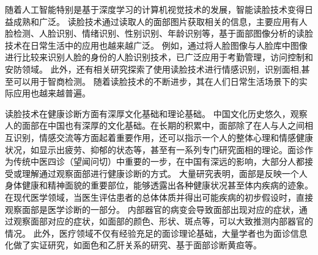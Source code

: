 % 
随着人工智能特别是基于深度学习的计算机视觉技术的发展，智能读脸技术变得日益成熟和广泛。
读脸技术通过读取人的面部图片获取相关的信息，主要应用有人脸检测、人脸识别、情绪识别、性别识别、年龄识别等，基于面部图像分析的读脸技术在日常生活中的应用也越来越广泛。
例如，通过将人脸图像与人脸库中图像进行比较来识别人脸的身份的人脸识别技术\cite{Zhang2016Joint, Schroff2015FaceNet}，已广泛应用于考勤管理\cite{surekha2017attendance}，访问控制\cite{atick2000continuous}和安防领域\cite{liu2005ibotguard}。
此外，还有相关研究探索了使用读脸技术进行情感识别\cite{corneanu2016survey}，识别面相\cite{Li2007Online, Tempark2012Chinese},甚至可以用于智商检测\cite{Kleisner2014Perceived}。
随着读脸技术的不断进步，其在人们日常生活场景下的实际应用也越来越普遍。

读脸技术在健康诊断方面有深厚文化基础和理论基础。
中国文化历史悠久，观察人的面部在中国也有深厚的文化基础。在长期的积累中，面部除了在人与人之间相互识别，情感交流等方面起着重要作用，还可以指示一个人的整体心理和情感健康状况，如显示出疲劳、抑郁的状态等，甚至有一系列专门研究面相的理论。面诊作为传统中医四诊（望闻问切）中重要的一步，在中国有深远的影响，大部分人都接受或理解通过观察面部进行健康诊断的方式。
大量研究表明，面部是反映一个人身体健康和精神面貌的重要部位，能够透露出各种健康状况甚至体内疾病的迹象。
在现代医学领域，当医生评估患者的总体体质并得出可能疾病的初步假设时，直接观察面部是医学诊断的一部分\cite{Clifford2006Shortliffe}。
内部器官的病变会导致面部出现对应的症状，通过观察面部对应的症状，如面部的颜色、形状、斑点等，可以大致推测内部器官的情况\cite{杨淑芳2002伤寒六经辨证初探}。
此外，医疗领域不仅有经验充足的面诊理论基础，大量学者也为面诊信息化做了实证研究，如面色和乙肝关系的研究\cite{杨宏志2007慢性乙型肝炎肝硬化中医面部五色诊断与临床病理的相关性研究, Li2008Therapeutic}、基于面部诊断黄疸\cite{艾英1998黄疸病人面部色泽定量实验研究}等。


% 


